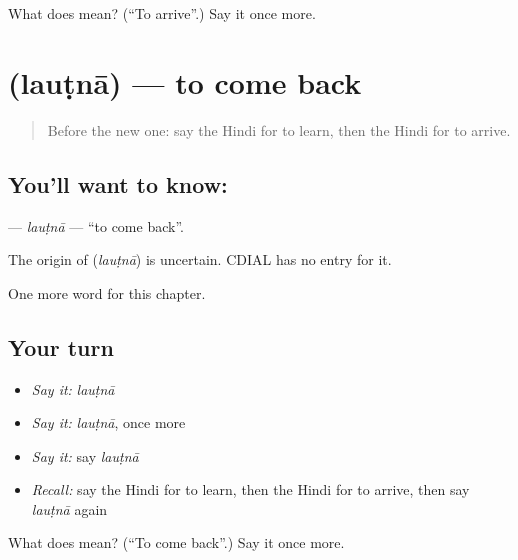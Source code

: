 \begin{tcolorbox}[breakable,colback=teal!4,colframe=teal!35!black,title={Before you move on}]
What does  mean? (\textquotedblleft{}To arrive\textquotedblright{}.) Say it once more.
\end{tcolorbox}
\section[\texorpdfstring{\hi{लौटना} (lauṭnā)}{लौटना (lauṭnā)}]{ (lauṭnā) — to come back}

\label{lesson:HI-C164-lautna}



\begin{quote}
Before the new one: say the Hindi for to learn, then the Hindi for to arrive.
\end{quote}

\subsection*{You'll want to know: }
\textbf{} — \emph{lauṭnā} — \textquotedblleft{}to come back\textquotedblright{}.

\begin{cousinweb}
The origin of \textbf{} (\emph{lauṭnā}) is uncertain. CDIAL has no entry for it.
\end{cousinweb}

\begin{grammarlens}[title={What you've built}]
One more word for this chapter.
\end{grammarlens}

\subsection*{Your turn}
\begin{itemize}
\raggedright
  \item \emph{Say it:} \emph{lauṭnā}
  \item \emph{Say it:} \emph{lauṭnā}, once more
  \item \emph{Say it:} say \emph{lauṭnā}
  \item \emph{Recall:} say the Hindi for to learn, then the Hindi for to arrive, then say \emph{lauṭnā} again
\end{itemize}

\begin{tcolorbox}[breakable,colback=teal!4,colframe=teal!35!black,title={Before you move on}]
What does  mean? (\textquotedblleft{}To come back\textquotedblright{}.) Say it once more.
\end{tcolorbox}
